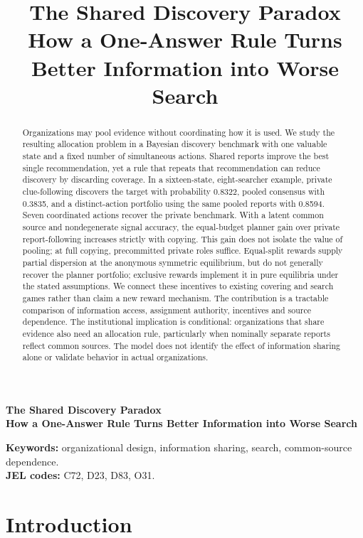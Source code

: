 \documentclass[11pt]{article}
\title{\textbf{The Shared Discovery Paradox}\\[0.35em]
\large How a One-Answer Rule Turns Better Information into Worse Search}
\author{}
\date{}
\theoremstyle{definition}
\theoremstyle{remark}
\newcommand{\1}{\mathbf{1}}
\begin{document}
\begin{center}\Large\bfseries The Shared Discovery Paradox\\[0.4em]\normalsize\normalfont How a One-Answer Rule Turns Better Information into Worse Search\end{center}\vspace{1em}


\begin{abstract}
Organizations may pool evidence without coordinating how it is used. We study the resulting allocation problem in a Bayesian discovery benchmark with one valuable state and a fixed number of simultaneous actions. Shared reports improve the best single recommendation, yet a rule that repeats that recommendation can reduce discovery by discarding coverage. In a sixteen-state, eight-searcher example, private clue-following discovers the target with probability 0.8322, pooled consensus with 0.3835, and a distinct-action portfolio using the same pooled reports with 0.8594. Seven coordinated actions recover the private benchmark. With a latent common source and nondegenerate signal accuracy, the equal-budget planner gain over private report-following increases strictly with copying. This gain does not isolate the value of pooling; at full copying, precommitted private roles suffice. Equal-split rewards supply partial dispersion at the anonymous symmetric equilibrium, but do not generally recover the planner portfolio; exclusive rewards implement it in pure equilibria under the stated assumptions. We connect these incentives to existing covering and search games rather than claim a new reward mechanism. The contribution is a tractable comparison of information access, assignment authority, incentives and source dependence. The institutional implication is conditional: organizations that share evidence also need an allocation rule, particularly when nominally separate reports reflect common sources. The model does not identify the effect of information sharing alone or validate behavior in actual organizations.
\end{abstract}

\noindent\textbf{Keywords:} organizational design, information sharing, search, common-source dependence.\\
\textbf{JEL codes:} C72, D23, D83, O31.

\section{Introduction}
\end{document}
